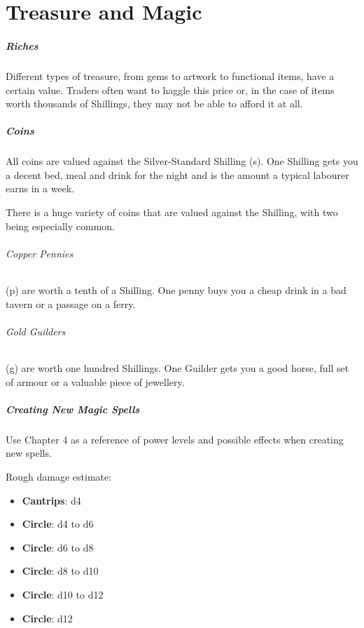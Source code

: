 \documentclass[itdr]{subfiles}
\begin{document}
\chapter{Treasure and Magic}

\paragraph{Riches}
Different types of treasure, from gems to artwork to functional items, have a certain value. Traders often want to haggle this price or, in the case of items worth thousands of Shillings, they may not be able to afford it at all.

\paragraph{Coins}
All coins are valued against the Silver-Standard Shilling (s). One Shilling gets you a decent bed, meal and drink for the night and is the amount a typical labourer earns in a week.

There is a huge variety of coins that are valued against the Shilling, with two being especially common.

\subparagraph{Copper Pennies} (p) are worth a tenth of a Shilling. One penny buys you a cheap drink in a bad tavern or a passage on a ferry.

\subparagraph{Gold Guilders} (g) are worth one hundred Shillings. One Guilder gets you a good horse, full set of armour or a valuable piece of jewellery.

\vfill

\paragraph{Creating New Magic Spells}
Use Chapter 4 as a reference of power levels and possible effects when creating new spells.

Rough damage estimate:
\begin{itemize}
	\item \textbf{Cantrips}: d4
	\item \textbf{ Circle}: d4 to d6
	\item \textbf{ Circle}: d6 to d8
	\item \textbf{ Circle}: d8 to d10
	\item \textbf{ Circle}: d10 to d12
	\item \textbf{ Circle}: d12
\end{itemize}
\end{document}
